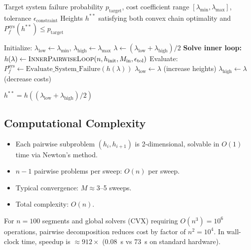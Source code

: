 \documentclass[12pt]{article}
\theoremstyle{definition}
\begin{document}
\begin{algorithm}[H]
\caption{Outer Loop: Reliability Constraint Satisfaction via Bisection}
\label{alg:pairwise_outer}
\begin{algorithmic}[1]
\Require Target system failure probability $p_{\text{target}}$, cost coefficient range $[\lambda_{\min}, \lambda_{\max}]$, tolerance $\epsilon_{\text{constraint}}$
\Ensure Heights $h^{**}$ satisfying both convex chain optimality and $P_f^{\text{sys}}(h^{**}) \leq p_{\text{target}}$

\State Initialize: $\lambda_{\text{low}} \leftarrow \lambda_{\min}$, $\lambda_{\text{high}} \leftarrow \lambda_{\max}$
    \State $\lambda \leftarrow (\lambda_{\text{low}} + \lambda_{\text{high}}) / 2$
    \State \textbf{Solve inner loop:} $h(\lambda) \leftarrow \textsc{InnerPairwiseLoop}(n, h_{\text{init}}, M_{\text{in}}, \epsilon_{\text{tol}})$
    \State Evaluate: $P_f^{\text{sys}} \leftarrow \text{Evaluate\_System\_Failure}(h(\lambda))$
        \State $\lambda_{\text{low}} \leftarrow \lambda$ (increase heights)
    \Else
        \State $\lambda_{\text{high}} \leftarrow \lambda$ (decrease costs)
    \EndIf
\EndWhile

\Return $h^{**} = h((\lambda_{\text{low}} + \lambda_{\text{high}})/2)$
\end{algorithmic}
\end{algorithm}

\subsection{Computational Complexity}

\begin{itemize}
    \item Each pairwise subproblem $(h_i, h_{i+1})$ is 2-dimensional, solvable in $O(1)$ time via Newton's method.
    \item $n-1$ pairwise problems per sweep: $O(n)$ per sweep.
    \item Typical convergence: $M \approx 3$--5 sweeps.
    \item Total complexity: $O(n)$.
\end{itemize}

For $n=100$ segments and global solvers (CVX) requiring $O(n^3) = 10^6$ operations, pairwise decomposition reduces cost by factor of $n^2 = 10^4$. In wall-clock time, speedup is $\approx 912\times$ (0.08~s vs 73~s on standard hardware).
\end{document}
